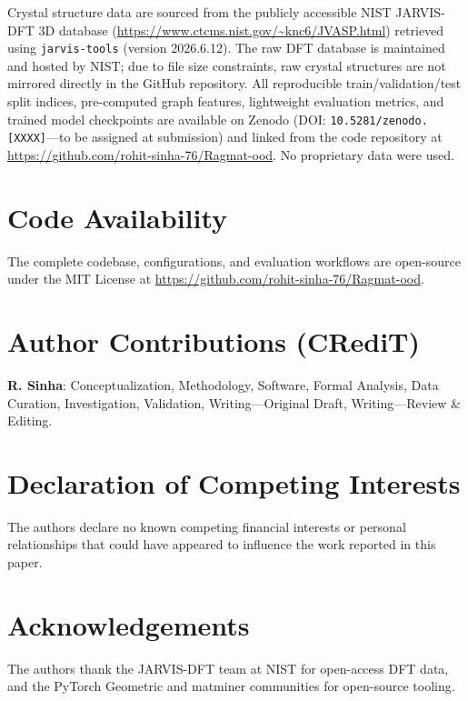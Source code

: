\documentclass[final,5p,twocolumn,10pt]{elsarticle}
\begin{document}
Crystal structure data are sourced from the publicly accessible NIST JARVIS-DFT
3D database (\url{https://www.ctcms.nist.gov/~knc6/JVASP.html}) retrieved using
\texttt{jarvis-tools} (version 2026.6.12). The raw DFT database is maintained and
hosted by NIST; due to file size constraints, raw crystal structures are not mirrored directly in the GitHub repository.
All reproducible train/validation/test split indices, pre-computed graph features, lightweight evaluation metrics,
and trained model checkpoints are available on Zenodo
(DOI: \texttt{10.5281/zenodo.[XXXX]}---to be assigned at submission) and linked from the code repository at
\url{https://github.com/rohit-sinha-76/Ragmat-ood}. No proprietary data were used.

\section*{Code Availability}

The complete codebase, configurations, and evaluation workflows are
open-source under the MIT License at
\url{https://github.com/rohit-sinha-76/Ragmat-ood}.

\section*{Author Contributions (CRediT)}
\textbf{R. Sinha}: Conceptualization, Methodology, Software, Formal
Analysis, Data Curation, Investigation, Validation, Writing---Original Draft,
Writing---Review \& Editing.

\section*{Declaration of Competing Interests}
The authors declare no known competing financial interests or personal
relationships that could have appeared to influence the work reported
in this paper.

\section*{Acknowledgements}
The authors thank the JARVIS-DFT team at NIST for open-access DFT data,
and the PyTorch Geometric and matminer communities for open-source tooling.
\end{document}

